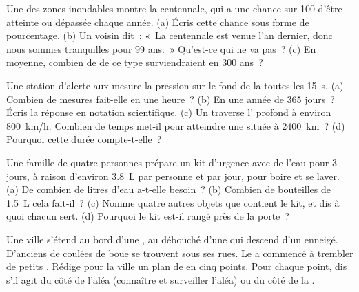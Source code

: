 \begin{exercise}[$\star\star$]\label{exo:g9:natural-risks:9}
Une  des zones inondables montre la  centennale, qui a une
chance sur 100 d'être atteinte ou dépassée chaque année. (a) Écris cette
chance sous forme de pourcentage. (b) Un voisin dit~: «~La 
centennale est venue l'an dernier, donc nous sommes tranquilles pour
99 ans.~» Qu'est-ce qui ne va pas~? (c) En moyenne, combien de  de ce
type surviendraient en 300 ans~?
\end{exercise}

\begin{exercise}[$\star\star$]\label{exo:g9:natural-risks:10}
Une station d'alerte aux  mesure la pression sur le fond de la 
toutes les \qty{15}{s}. (a) Combien de mesures fait-elle en une heure~?
(b) En une année de 365 jours~? Écris la réponse en notation
scientifique. (c) Un  traverse l' profond à environ
\qty{800}{km/h}. Combien de temps met-il pour atteindre une  située à
\qty{2400}{km}~? (d) Pourquoi cette durée compte-t-elle~?
\end{exercise}

\begin{exercise}[$\star\star\star$]\label{exo:g9:natural-risks:11}
Une famille de quatre personnes prépare un kit d'urgence avec de l'eau pour
3 jours, à raison d'environ \qty{3.8}{L} par personne et par jour, pour
boire et se laver. (a) De combien de litres d'eau a-t-elle besoin~?
(b) Combien de bouteilles de \qty{1.5}{L} cela fait-il~? (c) Nomme quatre
autres objets que contient le kit, et dis à quoi chacun sert. (d) Pourquoi
le kit est-il rangé près de la porte~?
\end{exercise}

\begin{exercise}[$\star\star\star$]\label{exo:g9:natural-risks:12}
Une ville s'étend au bord d'une , au débouché d'une  qui
descend d'un  enneigé. D'anciens  de coulées de boue se
trouvent sous ses rues. Le  a commencé à trembler de petits .
Rédige pour la ville un plan de  en cinq points. Pour chaque
point, dis s'il agit du côté de l'aléa (connaître et surveiller l'aléa) ou
du côté de la .
\end{exercise}

